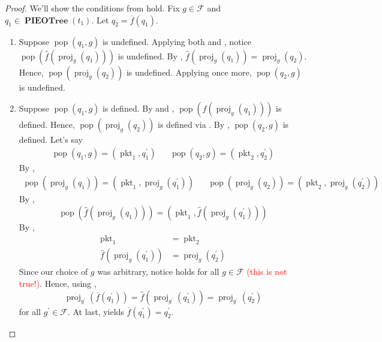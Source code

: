 \documentclass{amsart}
\DeclareMathOperator{\pkt}{\mathrm{pkt}}
\DeclareMathOperator{\pop}{\mathrm{pop}}
\DeclareMathOperator{\proj}{\mathrm{proj}}
\DeclareMathOperator{\PIEOTree}{\mathbf{PIEOTree}}
\theoremstyle{definition}
\begin{document}
\begin{proof}
    We'll show the conditions from  hold.
    Fix $g \in \mathcal F$ and $q_1 \in \PIEOTree(t_1)$.
    Let $q_2 = \overline{f}(q_1)$.
    \begin{enumerate}
        \item Suppose $\pop(q_1, g)$ is undefined. 
            Applying both  and \cite[Lemma ~5.6]{OG}, notice $\pop(\widehat{f}(\proj_g(q_1)))$ is undefined.
            By , $\widehat{f}(\proj_g(q_1)) = \proj_g(q_2)$.
            Hence, $\pop(\proj_g(q_2))$ is undefined.
            Applying  once more, $\pop(q_2, g)$ is undefined.

        \item Suppose $\pop(q_1, g)$ is defined. 
            By  and \cite[Lemma ~5.6]{OG}, $\pop(\widehat{f}(\proj_g(q_1)))$ is defined.
            Hence, $\pop(\proj_g(q_2))$ is defined via .
            By , $\pop(q_2, g)$ is defined.
            Let's say 
            \begin{align*}
                \pop(q_1, g) = (\pkt_1, q_1^\prime) && \pop(q_2, g) = (\pkt_2, q_2^\prime)
            \end{align*}
            By , 
            \begin{align*}
                \pop(\proj_g(q_1)) = (\pkt_1, \proj_g(q_1^\prime)) 
                &&
                \pop(\proj_g(q_2)) = (\pkt_2, \proj_g(q_2^\prime))
            \end{align*}
            By \cite[Lemma ~5.7]{OG},
            $$\pop(\widehat{f}(\proj_g(q_1))) = (\pkt_1, \widehat{f}(\proj_g(q_1^\prime)))$$
            By ,
            \begin{align*}
                \pkt_1 &= \pkt_2\\
                \widehat{f}(\proj_g(q_1^\prime)) &= \proj_g(q_2^\prime) \label{eq:popsim} \tag{$\dagger$} 
            \end{align*}
            Since our choice of $g$ was arbitrary, notice  holds for all $g \in \mathcal F$ \textcolor{red}{(this is not true!)}.
            Hence, using ,
            $$\proj_{g^\prime}(\overline{f}(q_1^\prime)) = \widehat{f}(\proj_{g^\prime}(q_1^\prime)) = \proj_{g^\prime}(q_2^\prime)$$
            for all $g^\prime \in \mathcal F$. 
            At last,  yields $\overline{f}(q_1^\prime) = q_2^\prime$. 
        

\end{enumerate}
\end{proof}
\end{document}
